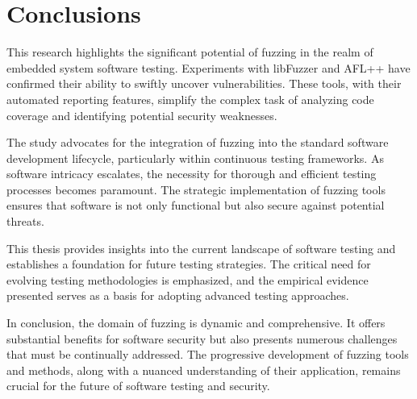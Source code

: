 \section{Conclusions}

This research highlights the significant potential of fuzzing in the realm of
embedded system software testing. Experiments with libFuzzer and AFL++ have
confirmed their ability to swiftly uncover vulnerabilities. These tools, with
their automated reporting features, simplify the complex task of analyzing code
coverage and identifying potential security weaknesses.

The study advocates for the integration of fuzzing into the standard software
development lifecycle, particularly within continuous testing frameworks. As
software intricacy escalates, the necessity for thorough and efficient testing
processes becomes paramount. The strategic implementation of fuzzing tools
ensures that software is not only functional but also secure against potential
threats.

This thesis provides insights into the current landscape of software testing
and establishes a foundation for future testing strategies. The critical need
for evolving testing methodologies is emphasized, and the empirical evidence
presented serves as a basis for adopting advanced testing approaches.

In conclusion, the domain of fuzzing is dynamic and comprehensive. It offers
substantial benefits for software security but also presents numerous challenges
that must be continually addressed. The progressive development of fuzzing tools
and methods, along with a nuanced understanding of their application, remains
crucial for the future of software testing and security.